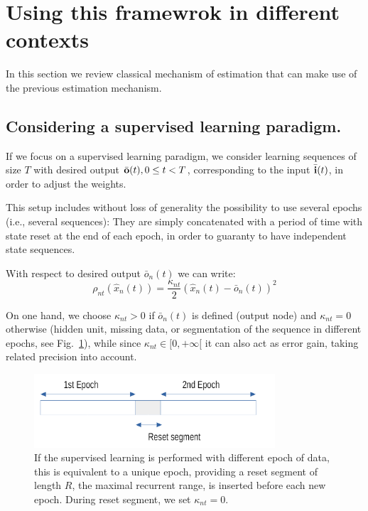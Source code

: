 \section{Using this framewrok in different contexts} \label{application}

In this section we review classical mechanism of estimation that can make use of the previous estimation mechanism. 

\subsection*{Considering a supervised learning paradigm.}

If we focus on a supervised learning paradigm, we consider learning sequences of size $T$ with desired output $\bar{\bf o}(t), 0 \le t < T$, corresponding to the input $\bar{\bf i}(t)$, in order to adjust the weights. 

This setup includes without loss of generality the possibility to use several epochs (i.e., several sequences): They are simply concatenated with a period of time with state reset at the end of each epoch, in order to guaranty to have independent state sequences.

With respect to desired output $\bar{o}_n(t)$ we can write:
\[ 
\rho_{nt}(\hat{x}_n(t)) = \frac{\kappa_{nt}}{2} (\hat{x}_n(t) - \bar{o}_n(t))^2
\]

On one hand, we choose $\kappa_{nt} > 0$ if $\bar{o}_n(t)$ is defined (output node) and $\kappa_{nt} = 0$ otherwise (hidden unit, missing data, or segmentation of the sequence in different epochs, see Fig.~\ref{epoch-concatenation}), while since $\kappa_{nt} \in [0, +\infty[$ it can also act as error gain, taking related precision into account. 

\begin{figure}[!ht]
  \includegraphics[width=0.8\textwidth]{img/epoch-concatenation}
  \caption{If the supervised learning is performed with different epoch of data, this is equivalent to a unique epoch, providing a reset segment of length $R$, the maximal recurrent range, is inserted before each new epoch. During reset segment, we set $\kappa_{nt}  = 0$.}
  \label{epoch-concatenation}
\end{figure}

